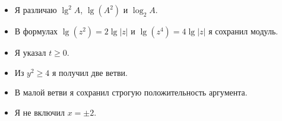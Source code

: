 \begin{questionsbox}[Самопроверка]
  \begin{itemize}[label=\choicebox,leftmargin=2.4em]
    \item Я различаю \(\lg^2 A\), \(\lg(A^2)\) и \(\log_2 A\).
    \item В формулах \(\lg(z^2)=2\lg|z|\) и \(\lg(z^4)=4\lg|z|\) я сохранил модуль.
    \item Я указал \(t\ge0\).
    \item Из \(y^2\ge4\) я получил две ветви.
    \item В малой ветви я сохранил строгую положительность аргумента.
    \item Я не включил \(x=\pm2\).
  \end{itemize}
\end{questionsbox}
